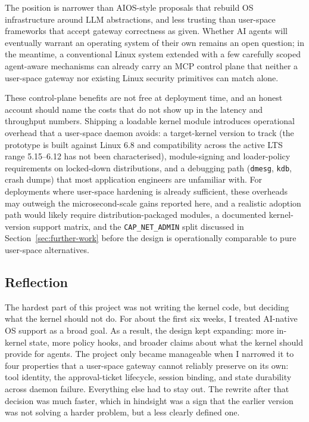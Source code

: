 The position is narrower than AIOS-style proposals that rebuild OS infrastructure around LLM abstractions, and less trusting than user-space frameworks that accept gateway correctness as given.
Whether AI agents will eventually warrant an operating system of their own remains an open question; in the meantime, a conventional Linux system extended with a few carefully scoped agent-aware mechanisms can already carry an MCP control plane that neither a user-space gateway nor existing Linux security primitives can match alone.

These control-plane benefits are not free at deployment time, and an honest account should name the costs that do not show up in the latency and throughput numbers.
Shipping a loadable kernel module introduces operational overhead that a user-space daemon avoids: a target-kernel version to track (the prototype is built against Linux 6.8 and compatibility across the active LTS range 5.15--6.12 has not been characterised), module-signing and loader-policy requirements on locked-down distributions, and a debugging path (\texttt{dmesg}, \texttt{kdb}, crash dumps) that most application engineers are unfamiliar with.
For deployments where user-space hardening is already sufficient, these overheads may outweigh the microsecond-scale gains reported here, and a realistic adoption path would likely require distribution-packaged modules, a documented kernel-version support matrix, and the \texttt{CAP\_\allowbreak NET\_\allowbreak ADMIN} split discussed in Section~\ref{sec:further-work} before the design is operationally comparable to pure user-space alternatives.

\subsection{Reflection}

The hardest part of this project was not writing the kernel code, but deciding what the kernel should not do.
For about the first six weeks, I treated AI-native OS support as a broad goal.
As a result, the design kept expanding: more in-kernel state, more policy hooks, and broader claims about what the kernel should provide for agents.
The project only became manageable when I narrowed it to four properties that a user-space gateway cannot reliably preserve on its own: tool identity, the approval-ticket lifecycle, session binding, and state durability across daemon failure.
Everything else had to stay out.
The rewrite after that decision was much faster, which in hindsight was a sign that the earlier version was not solving a harder problem, but a less clearly defined one.

